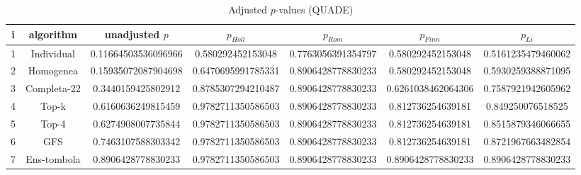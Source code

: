 \documentclass[a4paper,10pt]{article}
\begin{document}
\begin{landscape}
\begin{table}[!htp]
\centering\scriptsize
\caption{Adjusted $p$-values (QUADE)}
\begin{tabular}{ccccccc}
i&algorithm&unadjusted $p$&$p_{Holl}$&$p_{Rom}$&$p_{Finn}$&$p_{Li}$\\
\hline
1&Individual&0.11664503536096966&0.580292452153048&0.7763056391354797&0.580292452153048&0.5161235479460062\\
2&Homogenea&0.15935072087904698&0.6470695991785331&0.8906428778830233&0.580292452153048&0.5930259388871095\\
3&Completa-22&0.3440159425802912&0.8785307294210487&0.8906428778830233&0.6261038462064306&0.7587921942605962\\
4&Top-k&0.6160636249815459&0.9782711350586503&0.8906428778830233&0.812736254639181&0.849250076518525\\
5&Top-4&0.6274908007735844&0.9782711350586503&0.8906428778830233&0.812736254639181&0.8515879346066655\\
6&GFS&0.7463107588303342&0.9782711350586503&0.8906428778830233&0.812736254639181&0.8721967663482854\\
7&Ens-tombola&0.8906428778830233&0.9782711350586503&0.8906428778830233&0.8906428778830233&0.8906428778830233\\
\hline
\end{tabular}
\end{table}

\end{landscape}
\end{document}

